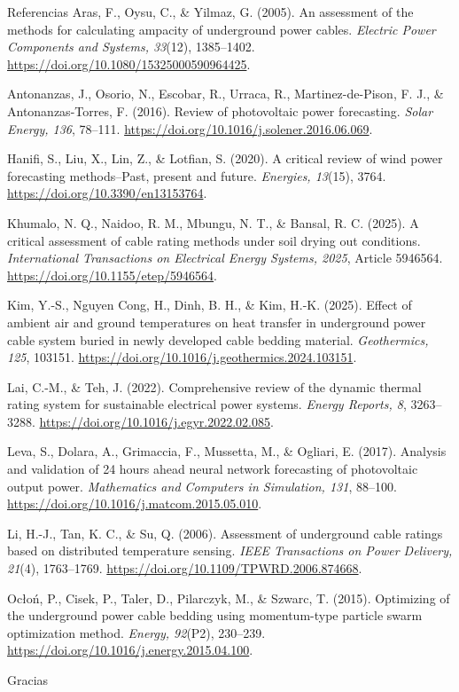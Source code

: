\documentclass[aspectratio=169]{beamer}
\begin{document}
\begin{frame}[allowframebreaks]{Referencias}
\footnotesize
\justifying
Aras, F., Oysu, C., \& Yilmaz, G. (2005). An assessment of the methods for calculating ampacity of underground power cables. \textit{Electric Power Components and Systems, 33}(12), 1385--1402. \url{https://doi.org/10.1080/15325000590964425}.
\bigskip
  
Antonanzas, J., Osorio, N., Escobar, R., Urraca, R., Martinez-de-Pison, F. J., \& Antonanzas-Torres, F. (2016). Review of photovoltaic power forecasting. \textit{Solar Energy, 136}, 78--111. \url{https://doi.org/10.1016/j.solener.2016.06.069}.
\bigskip

Hanifi, S., Liu, X., Lin, Z., \& Lotfian, S. (2020). A critical review of wind power forecasting methods--Past, present and future. \textit{Energies, 13}(15), 3764. \url{https://doi.org/10.3390/en13153764}.
\bigskip

Khumalo, N. Q., Naidoo, R. M., Mbungu, N. T., \& Bansal, R. C. (2025). A critical assessment of cable rating methods under soil drying out conditions. \textit{International Transactions on Electrical Energy Systems, 2025}, Article 5946564. \url{https://doi.org/10.1155/etep/5946564}.
\bigskip

Kim, Y.-S., Nguyen Cong, H., Dinh, B. H., \& Kim, H.-K. (2025). Effect of ambient air and ground temperatures on heat transfer in underground power cable system buried in newly developed cable bedding material. \textit{Geothermics, 125}, 103151. \url{https://doi.org/10.1016/j.geothermics.2024.103151}.
\bigskip

Lai, C.-M., \& Teh, J. (2022). Comprehensive review of the dynamic thermal rating system for sustainable electrical power systems. \textit{Energy Reports, 8}, 3263--3288. \url{https://doi.org/10.1016/j.egyr.2022.02.085}.
\bigskip

Leva, S., Dolara, A., Grimaccia, F., Mussetta, M., \& Ogliari, E. (2017). Analysis and validation of 24 hours ahead neural network forecasting of photovoltaic output power. \textit{Mathematics and Computers in Simulation, 131}, 88--100. \url{https://doi.org/10.1016/j.matcom.2015.05.010}.
\bigskip

Li, H.-J., Tan, K. C., \& Su, Q. (2006). Assessment of underground cable ratings based on distributed temperature sensing. \textit{IEEE Transactions on Power Delivery, 21}(4), 1763--1769. \url{https://doi.org/10.1109/TPWRD.2006.874668}.
\bigskip

Ocłoń, P., Cisek, P., Taler, D., Pilarczyk, M., \& Szwarc, T. (2015). Optimizing of the underground power cable bedding using momentum-type particle swarm optimization method. \textit{Energy, 92}(P2), 230--239. \url{https://doi.org/10.1016/j.energy.2015.04.100}.
\end{frame}

\begin{frame}
\centering
\Large Gracias
\end{frame}
\end{document}
